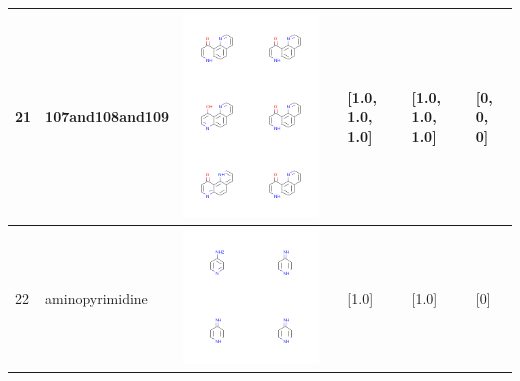 \begin{longtable}{|l|l|l|l|l|l|l|}
\hline
21 & 107and108and109 & \includegraphics[scale=0.6]{107and108and109MV.png} & & [1.0, 1.0, 1.0]& [1.0, 1.0, 1.0] & [0, 0, 0] \\
\hline
22 & aminopyrimidine & \includegraphics[scale=0.6]{aminopyrimidineMV.png} & & [1.0]& [1.0] & [0] \\

\end{longtable}
